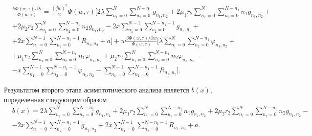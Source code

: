 \begin{equation}\label{predB}
	\begin{split}
		& \frac{\partial \Phi (w,\tau) /\partial\tau}{ \Phi (w,\tau)}=
		\frac{(j w)^2}{2}\Phi (w,\tau)\bigg[2\lambda\sum_{n_1=0}^N\sum_{n_2=0}^{N-n_1}g_{n_{1}, n_{2}}+2\mu_{1}r_{2}\sum_{n_1=0}^{N}\sum_{n_2=0}^{N-n_1}n_{1}g_{n_{1}, n_{2}}+\\
		&+2\mu_{2} r_{2}\sum_{n_1=0}^{N}\sum_{n_2=0}^{N-n_1}n_{2}g_{n_{1}, n_{2}}-2x\sum_{n_1=0}^{N-1}\sum_{n_2=0}^{N-n_1-1}g_{n_{1}, n_{2}}+\\
		&+2x\sum_{n_1=0}^{N-1}\sum_{n_2=0}^{N-n_1-1}R_{n_{1}, n_{2}}+a\bigg]+w\frac{\partial \Phi (w,\tau)/\partial w}{ \Phi (w,\tau)}\bigg[\lambda\sum_{n_1=0}^N\sum_{n_2=0}^{N-n_1}\varphi_{n_{1}, n_{2}}+\\
		&+\mu_{1}r_{2}\sum_{n_1=0}^{N}\sum_{n_2=0}^{N-n_1}n_{1}\varphi_{n_{1}, n_{2}}+\mu_{2}r_{2}\sum_{n_1=0}^{N}\sum_{n_2=0}^{N-n_1}n_{2}\varphi_{n_{1}, n_{2}}-\\
		&-x\sum_{n_1=0}^{N-1}\sum_{n_2=0}^{N-n_1-1}\varphi_{n_{1}, n_{2}}-\sum_{n_1=0}^{N-1}\sum_{n_2=0}^{N-n_1-1}R_{n_{1}, n_{2}}\bigg].
	\end{split}
\end{equation}

Результатом второго этапа асимптотического анализа является $b(x)$, определенная следующим образом
\begin{equation*}
	\begin{aligned}
		&b(x)=2\lambda\sum_{n_1=0}^N\sum_{n_2=0}^{N-n_1}g_{n_{1}, n_{2}}+2\mu_{1}r_{2}\sum_{n_1=0}^{N}\sum_{n_2=0}^{N-n_1}n_{1}g_{n_{1}, n_{2}}+2\mu_{2}r_{2}\sum_{n_1=0}^{N}\sum_{n_2=0}^{N-n_1}n_{2}g_{n_{1}, n_{2}}-\\
		&-2x\sum_{n_1=0}^{N-1}\sum_{n_2=0}^{N-n_1-1}g_{n_{1}, n_{2}}+2x\sum_{n_1=0}^{N-1}\sum_{n_2=0}^{N-n_1-1}R_{n_{1}, n_{2}}+a.
	\end{aligned}
\end{equation*}
